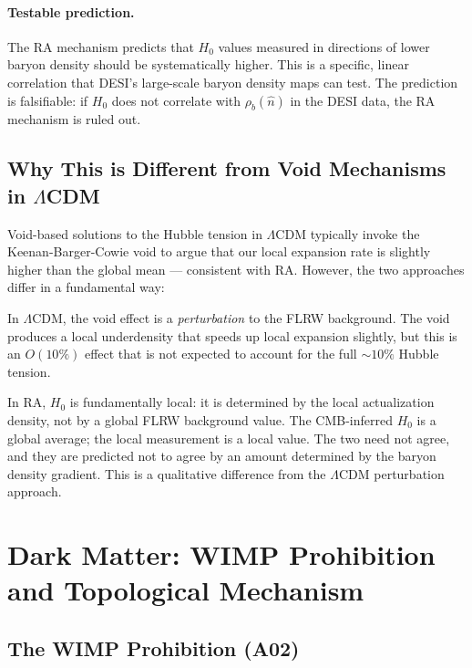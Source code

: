 \documentclass[12pt,a4paper]{article}
\begin{document}
\paragraph{Testable prediction.}  The RA mechanism predicts that $H_0$ values measured in directions of lower baryon density should be systematically higher.  This is a specific, linear correlation that DESI's large-scale baryon density maps can test.  The prediction is falsifiable: if $H_0$ does not correlate with $\rho_b(\hat{n})$ in the DESI data, the RA mechanism is ruled out.

\subsection{Why This is Different from Void Mechanisms in $\Lambda$CDM}

Void-based solutions to the Hubble tension in $\Lambda$CDM typically invoke the Keenan-Barger-Cowie void to argue that our local expansion rate is slightly higher than the global mean --- consistent with RA.  However, the two approaches differ in a fundamental way:

In $\Lambda$CDM, the void effect is a \emph{perturbation} to the FLRW background.  The void produces a local underdensity that speeds up local expansion slightly, but this is an $O(10\%)$ effect that is not expected to account for the full $\sim10\%$ Hubble tension.

In RA, $H_0$ is fundamentally local: it is determined by the local actualization density, not by a global FLRW background value.  The CMB-inferred $H_0$ is a global average; the local measurement is a local value.  The two need not agree, and they are predicted not to agree by an amount determined by the baryon density gradient.  This is a qualitative difference from the $\Lambda$CDM perturbation approach.

\section{Dark Matter: WIMP Prohibition and Topological Mechanism}\label{sec:dm}

\subsection{The WIMP Prohibition (A02)}
\end{document}
